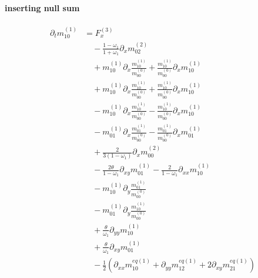\documentclass{article}
\begin{document}
  \paragraph{inserting null sum}
  \begin{equation*}
    \begin{aligned}
    \partial_t m_{10}^{(1)}
     & =
      F_x^{(3)}
      \\&\quad
      -\frac{1-\omega_1}{1+\omega_1} \partial_x m_{02}^{(2)}
      \\&\quad
      + m_{10}^{(1)}\partial_x \frac{  m_{10}^{(1)}}{m_{00}^{(0)}} + \frac{ m_{10}^{(1)}}{m_{00}^{(0)}} \partial_x  m_{10}^{(1)}
      \\&\quad
      + m_{10}^{(1)}\partial_x \frac{  m_{10}^{(1)}}{m_{00}^{(0)}} + \frac{ m_{10}^{(1)}}{m_{00}^{(0)}} \partial_x  m_{10}^{(1)}
      \\&\quad
      - m_{10}^{(1)}\partial_x \frac{  m_{10}^{(1)}}{m_{00}^{(0)}} - \frac{ m_{10}^{(1)}}{m_{00}^{(0)}} \partial_x  m_{10}^{(1)}
      \\&\quad
      - m_{01}^{(1)}\partial_x \frac{  m_{01}^{(1)}}{m_{00}^{(0)}} - \frac{ m_{01}^{(1)}}{m_{00}^{(0)}} \partial_x  m_{01}^{(1)}
      \\&\quad
      + \frac{ 2}{3(1-\omega_1)}\partial_x m_{00}^{(2)}
      \\&\quad
      - \frac{2\theta}{1-\omega_1}\partial_{xy} m_{01}^{(1)} - \frac{2}{1-\omega_1}\partial_{xx} m_{10}^{(1)}
      \\&\quad
      - m_{10}^{(1)}\partial_y \frac{ m_{01}^{(1)}}{m_{00}^{(0)}}
      \\&\quad
      - m_{01}^{(1)}\partial_y \frac{ m_{10}^{(1)}}{m_{00}^{(0)}}
      \\&\quad
      + \frac{\theta}{\omega_1}\partial_{yy} m_{10}^{(1)}
      \\&\quad
      + \frac{\theta}{\omega_1}\partial_{xy} m_{01}^{(1)}
      \\&\quad
      - \frac{1}{2} (\partial_{xx} m_{10}^{eq(1)} + \partial_{yy} m_{12}^{eq(1)} + 2\partial_{xy} m_{21}^{eq(1)})
    \end{aligned}
  \end{equation*}
\end{document}
